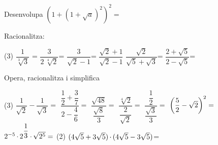 \documentclass[11pt, a4paper, pdf]{article}
\let\frac\dfrac
\begin{document}
\begin{mylist}
		
		\item  Desenvolupa $\left(1+\left(1+\sqrt{a} \right)^{2} \right)^{2} =$
		
	
		\item   Racionalitza:
		\begin{tasks}(3)
			\task $\dfrac{1}{\sqrt[{3}]{3} } $ =     
			\task $\dfrac{3}{2\, \sqrt[{4}]{2} } $=        
			\task $\dfrac{3}{\sqrt{2} -1} $=
			\task $\dfrac{\sqrt{2} +1}{\sqrt{2} -1} $   
			\task $\dfrac{\sqrt{2} }{\sqrt{5} +\sqrt{3} } $=    
			\task $\dfrac{2+\sqrt{5} }{2-\sqrt{5} } $=
		\end{tasks}
		 
		
		\item  Opera, racionalitza i simplifica
		\begin{tasks}(3)
			\task $\dfrac{1}{\sqrt{2}} - \dfrac{1}{\sqrt{3}} =$   
			\task $\dfrac{\frac{1}{2} +\frac{3}{7} }{2-\frac{4}{6} } =$   
			\task $\dfrac{\sqrt{48} }{\frac{\sqrt{8} }{3} } =$  
			\task $\dfrac{\sqrt[{4}]{2} }{\frac{2}{\sqrt{2} } } =$ 
			\task $\dfrac{\frac{1}{2} }{\frac{\sqrt{3} }{3} } =$        
			\task $\left(\frac{{\rm 5}}{{\rm 2}} -\sqrt{{\rm 2}} \right)^{{\rm 2}} =$  
			\task ${\rm 2}^{-{\rm 5}} \, {\rm \cdot }\, {\rm 2}^{\frac{{\rm 1}}{{\rm 3}} } \, {\rm \cdot }\, \sqrt{{\rm 2}^{{\rm 5}} } =$
			\task*(2) ${\rm (4}\sqrt{{\rm 5}} +{\rm 3}\sqrt{{\rm 5}} {\rm )}\, {\rm \cdot }\, {\rm (4}\sqrt{{\rm 5}} -{\rm 3}\sqrt{{\rm 5}} {\rm )}$=  
		\end{tasks}
	\end{mylist}
\end{document}
